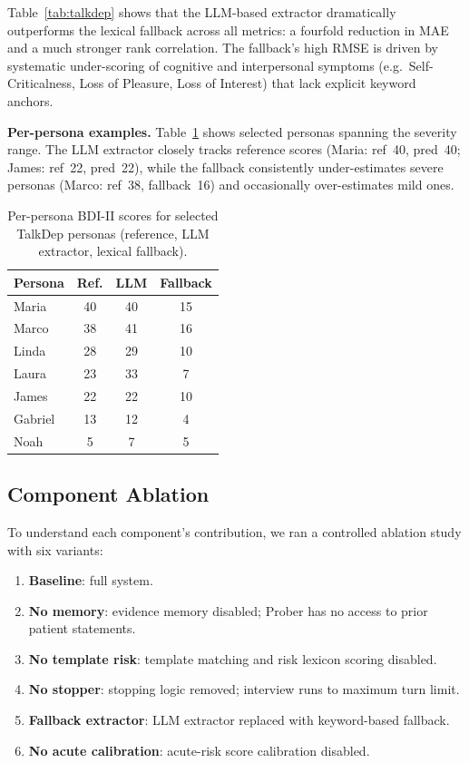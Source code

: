 \documentclass[]{ceurart}
\begin{document}
Table~\ref{tab:talkdep} shows that the LLM-based extractor dramatically outperforms the lexical fallback across all metrics: a fourfold reduction in MAE and a much stronger rank correlation.
The fallback's high RMSE is driven by systematic under-scoring of cognitive and interpersonal symptoms (e.g.\ Self-Criticalness, Loss of Pleasure, Loss of Interest) that lack explicit keyword anchors.

\textbf{Per-persona examples.}
Table~\ref{tab:persona} shows selected personas spanning the severity range.
The LLM extractor closely tracks reference scores (Maria: ref~40, pred~40; James: ref~22, pred~22), while the fallback consistently under-estimates severe personas (Marco: ref~38, fallback~16) and occasionally over-estimates mild ones.

\begin{table}[t]
\caption{Per-persona BDI-II scores for selected TalkDep personas (reference, LLM extractor, lexical fallback).}
\label{tab:persona}
\centering
\small
\begin{tabular}{lccc}
\toprule
\textbf{Persona} & \textbf{Ref.} & \textbf{LLM} & \textbf{Fallback} \\
\midrule
Maria  & 40 & 40 & 15 \\
Marco  & 38 & 41 & 16 \\
Linda  & 28 & 29 & 10 \\
Laura  & 23 & 33 & 7  \\
James  & 22 & 22 & 10 \\
Gabriel& 13 & 12 & 4  \\
Noah   &  5 &  7 & 5  \\
\bottomrule
\end{tabular}
\end{table}


\subsection{Component Ablation}\label{sec:ablation}

To understand each component's contribution, we ran a controlled ablation study with six variants:
\begin{enumerate}
\item \textbf{Baseline}: full system.
\item \textbf{No memory}: evidence memory disabled; Prober has no access to prior patient statements.
\item \textbf{No template risk}: template matching and risk lexicon scoring disabled.
\item \textbf{No stopper}: stopping logic removed; interview runs to maximum turn limit.
\item \textbf{Fallback extractor}: LLM extractor replaced with keyword-based fallback.
\item \textbf{No acute calibration}: acute-risk score calibration disabled.
\end{enumerate}
\end{document}
